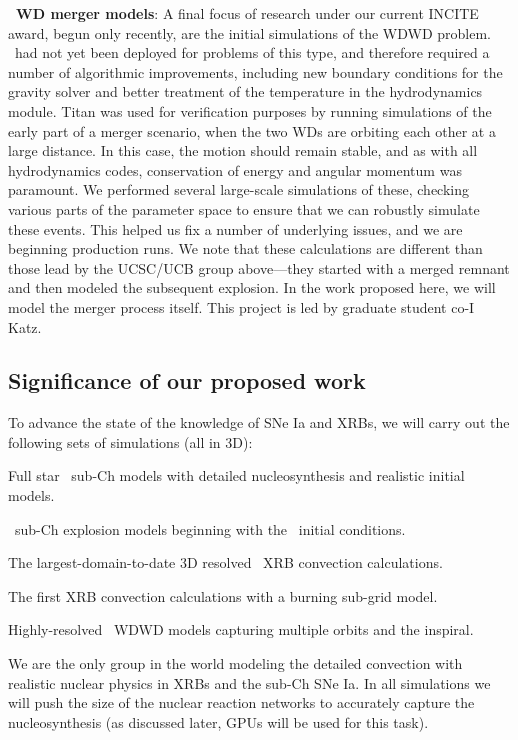 \documentclass[11pt,letterpaper,english]{article}
\begin{document}
{\bf \castro\ WD merger models}:
%
A final focus of research under our current INCITE award, begun only
recently, are the initial simulations of the WDWD problem.  \castro\ had not yet been deployed for problems of this type,
and therefore required a number of algorithmic
improvements, including new boundary conditions for the gravity solver
and better treatment of the temperature in the hydrodynamics module.
Titan was used for verification purposes by running simulations of the
early part of a merger scenario, when the two WDs are orbiting each
other at a large distance. In this case, the motion should remain
stable, and as with all hydrodynamics codes, conservation of energy
and angular momentum was paramount. We performed several large-scale
simulations of these, checking various parts of the parameter space to
ensure that we can robustly simulate these events. This helped us fix
a number of underlying issues, and we are beginning production runs.
We note that these calculations are different than those lead by the
UCSC/UCB group above---they started with a merged remnant and then
modeled the subsequent explosion.  In the work proposed here, we 
will model the merger process itself.  This project is led by graduate
student co-I Katz.


\subsection{Significance of our proposed work}

To advance the state of the knowledge of SNe Ia and XRBs, we will
carry out the following sets of simulations (all in 3D):
\begin{tightitem}
\item Full star \maestro\ sub-Ch models with 
  detailed nucleosynthesis and realistic initial models.
\item \castro\ sub-Ch explosion models beginning with the
  \maestro\ initial conditions.
\item The largest-domain-to-date 3D resolved \maestro\ XRB convection
  calculations.
\item The first XRB convection calculations with a burning sub-grid
  model.
\item Highly-resolved \castro\ WDWD models capturing multiple orbits
  and the inspiral.
\end{tightitem}

We are the only group in the world modeling the detailed convection
with realistic nuclear physics in XRBs and the sub-Ch SNe Ia.
In all simulations we will push the size of the nuclear reaction networks
to accurately capture the nucleosynthesis (as discussed later, GPUs will
be used for this task).
\end{document}
